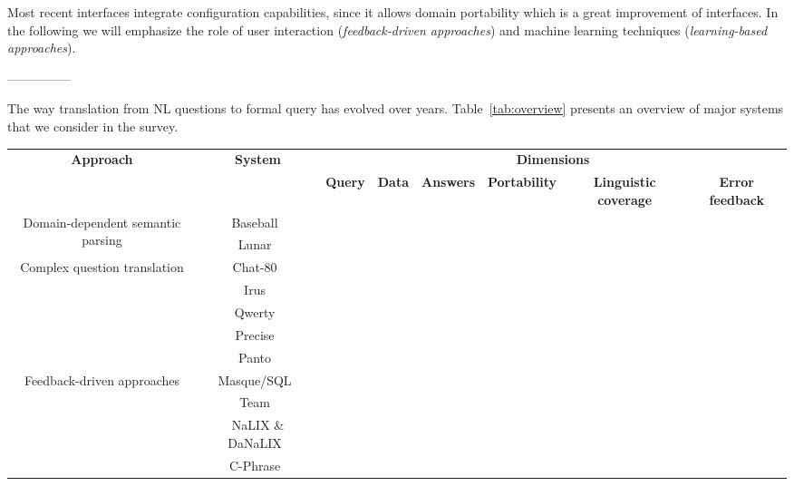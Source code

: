 \documentclass[10pt,journal,letterpaper,compsoc]{IEEEtran}
\begin{document}
Most recent interfaces integrate configuration capabilities, since it allows
domain portability which is a great improvement of interfaces. In the following
we will emphasize the role of user interaction ({\it feedback-driven
approaches}) and machine learning techniques ({\it learning-based approaches}).

---------------

The way translation from NL questions to formal query has evolved over years.
Table~\ref{tab:overview} presents an overview of major systems that we consider
in the survey.

\begin{table}
\centering
\begin{tabular}{|c|c|c|c|c|c|c|c|}\hline
\multirow{2}{*}{\bf Approach} & \multirow{2}{*}{\bf System} &
\multicolumn{6}{c|}{\bf Dimensions}\\\cline{3-8}
& & {\bf Query} & {\bf Data} & {\bf Answers} & {\bf Portability} & {\bf
Linguistic coverage} & {\bf Error feedback}\\\hline\hline 
\multirow{2}{*}{Domain-dependent semantic parsing} & {\sc
Baseball}~\cite{Green:1961:BAQ:1460690.1460714} & & & & & & \\\cline{2-8}
& {\sc Lunar}~\cite{Woods:1973:PNL:1499586.1499695} & & & & & & \\\hline
\multirow{5}{*}{Complex question translation} & {\sc
Chat-80}~\cite{Warren:1982:EEA:972942.972944} & & & & & & \\\cline{2-8}
& {\sc Irus}~\cite{Bates:1983:IRU:511793.511804} & & & & & & \\\cline{2-8}
& {\sc Qwerty}~\cite{Nelken:2000:QTD:992730.992808} & & & & & & \\\cline{2-8}
& {\sc
Precise}~\cite{Popescu:2004:MNL:1220355.1220376,Popescu:2003:TTN:604045.604070}
& & & & & & \\\cline{2-8}
& {\sc Panto}~\cite{Wang:2007:PPN:1419662.1419706} & & & & & & \\\hline
\multirow{5}{*}{Feedback-driven approaches} &
{\sc Masque/SQL}~\cite{Androutsopoulos93masque} & & & & & & \\\cline{2-8}
& {\sc Team}~\cite{Grosz:1987:TED:25672.25674} & & & & & & \\\cline{2-8}
& {\sc NaLIX} \& {\sc DaNaLIX}~\cite{Li:2005:NIN:1066157.1066281} & & & & & &
\\\cline{2-8}
& {\sc C-Phrase}~\cite{Minock:2010:CSB:1715942.1716190} & & & & & &
\\\cline{2-8}

\end{tabular}
\end{table}
\end{document}
